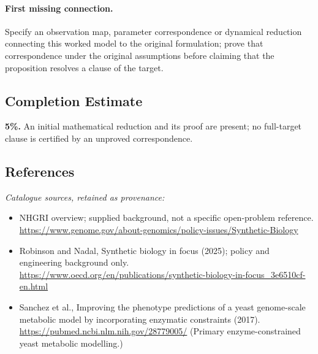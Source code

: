 \documentclass[11pt]{article}
\begin{document}
\paragraph{First missing connection.} Specify an observation map, parameter correspondence or dynamical reduction connecting this worked model to the original formulation; prove that correspondence under the original assumptions before claiming that the proposition resolves a clause of the target.
\subsection{Completion Estimate}
\textbf{5\%.} An initial mathematical reduction and its proof are present; no full-target clause is certified by an unproved correspondence.
\subsection{References}
\noindent\emph{Catalogue sources, retained as provenance:}
\begin{itemize}
\item NHGRI overview; supplied background, not a specific open-problem reference. \url{https://www.genome.gov/about-genomics/policy-issues/Synthetic-Biology}
\item Robinson and Nadal, Synthetic biology in focus (2025); policy and engineering background only. \url{https://www.oecd.org/en/publications/synthetic-biology-in-focus_3e6510cf-en.html}
\item Sanchez et al., Improving the phenotype predictions of a yeast genome-scale metabolic model by incorporating enzymatic constraints (2017). \url{https://pubmed.ncbi.nlm.nih.gov/28779005/} (Primary enzyme-constrained yeast metabolic modelling.)
\end{itemize}
\end{document}
